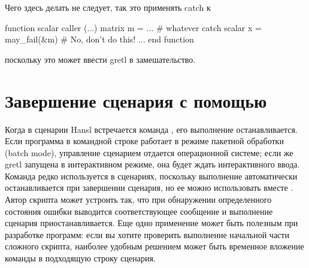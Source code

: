 
Чего здесь делать не следует, так это применять catch к

\begin{code}
function scalar caller (...)
  matrix m = ... # whatever
  catch scalar x = may_fail(&m) # No, don't do this!
  ...
end function
\end{code}

поскольку это может ввести gretl в замешательство.

\section{Завершение сценария с помощью }

Когда в сценарии Hansl встречается команда , его выполнение
останавливается. Если программа  в командной строке
работает в режиме пакетной обработки (batch mode), управление
сценарием отдается операционной системе; если же gretl запущена в
интерактивном режиме, она будет ждать интерактивного ввода.  Команда
 редко используется в сценариях, поскольку выполнение
автоматически останавливается при завершении сценария, но ее можно
использовать вместе . Автор скрипта может устроить так, что
при обнаружении определенного состояния ошибки выводится
соответствующее сообщение и выполнение сценария
приостанавливается. Еще одно применение  может быть полезным
при разработке программ: если вы хотите проверить выполнение начальной
части сложного скрипта, наиболее удобным решением может быть временное
вложение команды  в подходящую строку сценария.

